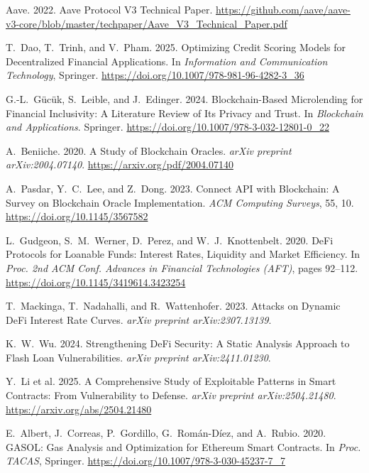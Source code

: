 \documentclass[12pt, a4paper]{report}
\begin{document}
{\begin{enumerate}[label={[\arabic*]}]
\item Aave. 2022. Aave Protocol V3 Technical Paper. \url{https://github.com/aave/aave-v3-core/blob/master/techpaper/Aave_V3_Technical_Paper.pdf}

\item T.~Dao, T.~Trinh, and V.~Pham. 2025. Optimizing Credit Scoring Models for Decentralized Financial Applications. In \emph{Information and Communication Technology}, Springer. \url{https://doi.org/10.1007/978-981-96-4282-3_36}

\item G.-L.~G\"{u}c\"{u}k, S.~Leible, and J.~Edinger. 2024. Blockchain-Based Microlending for Financial Inclusivity: A Literature Review of Its Privacy and Trust. In \emph{Blockchain and Applications}. Springer. \url{https://doi.org/10.1007/978-3-032-12801-0_22}

\item A.~Beniiche. 2020. A Study of Blockchain Oracles. \emph{arXiv preprint arXiv:2004.07140}. \url{https://arxiv.org/pdf/2004.07140}

\item A.~Pasdar, Y.~C.~Lee, and Z.~Dong. 2023. Connect API with Blockchain: A Survey on Blockchain Oracle Implementation. \emph{ACM Computing Surveys}, 55, 10. \url{https://doi.org/10.1145/3567582}

\item L.~Gudgeon, S.~M.~Werner, D.~Perez, and W.~J.~Knottenbelt. 2020. DeFi Protocols for Loanable Funds: Interest Rates, Liquidity and Market Efficiency. In \emph{Proc. 2nd ACM Conf. Advances in Financial Technologies (AFT)}, pages 92--112. \url{https://doi.org/10.1145/3419614.3423254}

\item T.~Mackinga, T.~Nadahalli, and R.~Wattenhofer. 2023. Attacks on Dynamic DeFi Interest Rate Curves. \emph{arXiv preprint arXiv:2307.13139}.

\item K.~W.~Wu. 2024. Strengthening DeFi Security: A Static Analysis Approach to Flash Loan Vulnerabilities. \emph{arXiv preprint arXiv:2411.01230}.

\item Y.~Li et al. 2025. A Comprehensive Study of Exploitable Patterns in Smart Contracts: From Vulnerability to Defense. \emph{arXiv preprint arXiv:2504.21480}. \url{https://arxiv.org/abs/2504.21480}

\item E.~Albert, J.~Correas, P.~Gordillo, G.~Rom\'{a}n-D\'{i}ez, and A.~Rubio. 2020. GASOL: Gas Analysis and Optimization for Ethereum Smart Contracts. In \emph{Proc. TACAS}, Springer. \url{https://doi.org/10.1007/978-3-030-45237-7_7}


\end{enumerate}}
\end{document}
